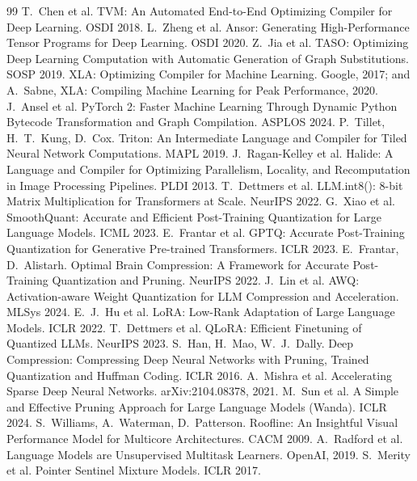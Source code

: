 \documentclass[11pt,a4paper]{ctexart}
\begin{document}
\begin{thebibliography}{99}
 T.~Chen et al. TVM: An Automated End-to-End Optimizing Compiler for Deep Learning. OSDI 2018.
 L.~Zheng et al. Ansor: Generating High-Performance Tensor Programs for Deep Learning. OSDI 2020.
 Z.~Jia et al. TASO: Optimizing Deep Learning Computation with Automatic Generation of Graph Substitutions. SOSP 2019.
 XLA: Optimizing Compiler for Machine Learning. Google, 2017; and A.~Sabne, XLA: Compiling Machine Learning for Peak Performance, 2020.
 J.~Ansel et al. PyTorch 2: Faster Machine Learning Through Dynamic Python Bytecode Transformation and Graph Compilation. ASPLOS 2024.
 P.~Tillet, H.~T.~Kung, D.~Cox. Triton: An Intermediate Language and Compiler for Tiled Neural Network Computations. MAPL 2019.
 J.~Ragan-Kelley et al. Halide: A Language and Compiler for Optimizing Parallelism, Locality, and Recomputation in Image Processing Pipelines. PLDI 2013.
 T.~Dettmers et al. LLM.int8(): 8-bit Matrix Multiplication for Transformers at Scale. NeurIPS 2022.
 G.~Xiao et al. SmoothQuant: Accurate and Efficient Post-Training Quantization for Large Language Models. ICML 2023.
 E.~Frantar et al. GPTQ: Accurate Post-Training Quantization for Generative Pre-trained Transformers. ICLR 2023.
 E.~Frantar, D.~Alistarh. Optimal Brain Compression: A Framework for Accurate Post-Training Quantization and Pruning. NeurIPS 2022.
 J.~Lin et al. AWQ: Activation-aware Weight Quantization for LLM Compression and Acceleration. MLSys 2024.
 E.~J.~Hu et al. LoRA: Low-Rank Adaptation of Large Language Models. ICLR 2022.
 T.~Dettmers et al. QLoRA: Efficient Finetuning of Quantized LLMs. NeurIPS 2023.
 S.~Han, H.~Mao, W.~J.~Dally. Deep Compression: Compressing Deep Neural Networks with Pruning, Trained Quantization and Huffman Coding. ICLR 2016.
 A.~Mishra et al. Accelerating Sparse Deep Neural Networks. arXiv:2104.08378, 2021.
 M.~Sun et al. A Simple and Effective Pruning Approach for Large Language Models (Wanda). ICLR 2024.
 S.~Williams, A.~Waterman, D.~Patterson. Roofline: An Insightful Visual Performance Model for Multicore Architectures. CACM 2009.
 A.~Radford et al. Language Models are Unsupervised Multitask Learners. OpenAI, 2019.
 S.~Merity et al. Pointer Sentinel Mixture Models. ICLR 2017.
\end{thebibliography}
\end{document}
